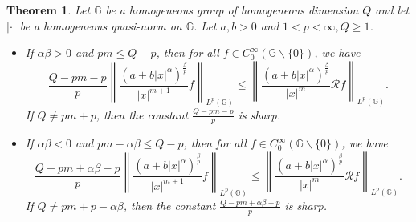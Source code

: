 \documentclass[a4paper,12pt,reqno]{amsart}
\numberwithin{equation}{section}
\theoremstyle{plain}
\newtheorem{thm}{Theorem}[section]
\theoremstyle{definition}
\begin{document}
\begin{thm}\label{1}
Let $\mathbb{G}$ be a homogeneous group
of homogeneous dimension $Q$ and let $|\cdot|$ be a homogeneous quasi-norm on $\mathbb{G}$. Let $a,b>0$ and $1<p<\infty, Q\geq1$.
\begin{itemize}
\item[(i)] If $\alpha \beta>0$ and $pm\leq Q-p$, then for all $f\in C_{0}^{\infty}(\mathbb{G}\backslash\{0\})$, we have
\begin{equation}\label{Lpweighted1}
\frac{Q-pm-p}{p}
\left\|\frac{(a+b|x|^{\alpha})^{\frac{\beta}{p}}}{|x|^{m+1}}f\right\|_{L^{p}(\mathbb{G})}
\leq\left\|\frac{(a+b|x|^{\alpha})^{\frac{\beta}{p}}}{|x|^{m}}\mathcal{R}f\right\|_{L^{p}(\mathbb{G})} .
\end{equation}
If $Q\neq pm+p$, then the constant $\frac{Q-pm-p}{p}$ is sharp.

\item[(ii)] If $\alpha \beta<0$ and $pm-\alpha\beta\leq Q-p$, then for all $f\in C_{0}^{\infty}(\mathbb{G}\backslash\{0\})$, we have
\begin{equation}\label{Lpweighted2}
\frac{Q-pm+\alpha\beta-p}{p}
\left\|\frac{(a+b|x|^{\alpha})^{\frac{\beta}{p}}}{|x|^{m+1}}f\right\|_{L^{p}(\mathbb{G})}
\leq\left\|\frac{(a+b|x|^{\alpha})^{\frac{\beta}{p}}}{|x|^{m}}\mathcal{R}f\right\|_{L^{p}(\mathbb{G})}
.
\end{equation}
If $Q\neq pm+p-\alpha\beta$, then the constant $\frac{Q-pm+\alpha\beta-p}{p}$ is sharp.
\end{itemize}
\end{thm}
\end{document}
